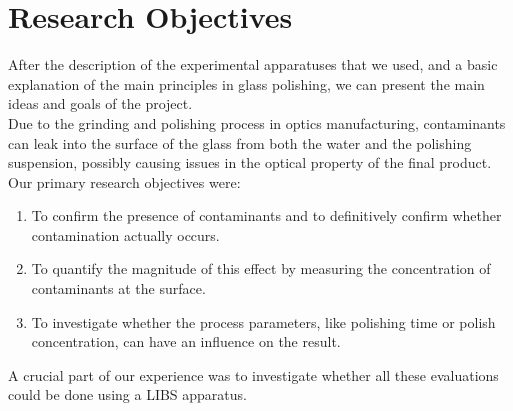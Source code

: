 \label{ch:experimental_measurements}
\section{Research Objectives}
After the description of the experimental apparatuses that we used, and a basic explanation of the main principles in glass polishing, we can present the main ideas and goals of the project.
\\
Due to the grinding and polishing process in optics manufacturing, contaminants can leak into the surface of the glass from both the water and the polishing suspension, possibly causing issues in the optical property of the final product.
\\
Our primary research objectives were:
\begin{enumerate}
    \item To confirm the presence of contaminants and to definitively confirm whether contamination actually occurs.
    \item To quantify the magnitude of this effect by measuring the concentration of contaminants at the surface.
    \item To investigate whether the process parameters, like polishing time or polish concentration, can have an influence on the result.
\end{enumerate}
A crucial part of our experience was to investigate whether all these evaluations could be done using a LIBS apparatus.

